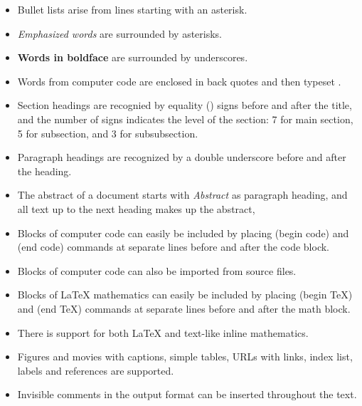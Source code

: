 \documentclass{book}
\begin{document}
\begin{itemize}
  \item Bullet lists arise from lines starting with an asterisk.

  \item \emph{Emphasized words} are surrounded by asterisks.

  \item \textbf{Words in boldface} are surrounded by underscores.

  \item Words from computer code are enclosed in back quotes and
    then typeset .

  \item Section headings are recognied by equality (\code{=}) signs before
    and after the title, and the number of \code{=} signs indicates the
    level of the section: 7 for main section, 5 for subsection, and
    3 for subsubsection.

  \item Paragraph headings are recognized by a double underscore
    before and after the heading.

  \item The abstract of a document starts with \emph{Abstract} as paragraph
    heading, and all text up to the next heading makes up the abstract,

  \item Blocks of computer code can easily be included by placing
     (begin code) and  (end code) commands at separate lines
    before and after the code block.

  \item Blocks of computer code can also be imported from source files.

  \item Blocks of {\LaTeX} mathematics can easily be included by placing
     (begin TeX) and  (end TeX) commands at separate lines
    before and after the math block.

  \item There is support for both {\LaTeX} and text-like inline mathematics.

  \item Figures and movies with captions, simple tables,
    URLs with links, index list, labels and references are supported.

  \item Invisible comments in the output format can be inserted throughout
    the text.


\end{itemize}
\end{document}
